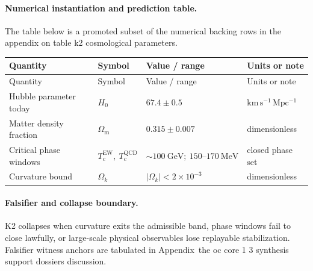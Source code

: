 \paragraph{Numerical instantiation and prediction table.}
The table below is a promoted subset of the numerical backing rows in the appendix on table k2 cosmological parameters.
\begin{longtable}{@{}L{0.27\textwidth}L{0.15\textwidth}L{0.24\textwidth}L{0.16\textwidth}@{}}
\toprule
Quantity & Symbol & Value / range & Units or note \\
\midrule
\endfirsthead
\toprule
Quantity & Symbol & Value / range & Units or note \\
\midrule
\endhead
Hubble parameter today & $\scriptstyle H_0$ & $67.4 \pm 0.5$ & $\mathrm{km\,s^{-1}\,Mpc^{-1}}$ \\
Matter density fraction & $\scriptstyle \Omega_{\mathrm{m}}$ & $0.315 \pm 0.007$ & dimensionless \\
Critical phase windows & $\scriptstyle T_c^{\mathrm{EW}},\allowbreak \ T_c^{\mathrm{QCD}}$ & $\sim 100\ \mathrm{GeV};\allowbreak \ 150\text{--}170\ \mathrm{MeV}$ & closed phase set \\
Curvature bound & $\scriptstyle \Omega_k$ & $|\Omega_k| < 2 \times 10^{-3}$ & dimensionless \\
\bottomrule
\end{longtable}

\paragraph{Falsifier and collapse boundary.}
K2 collapses when curvature exits the admissible band, phase windows fail to close lawfully, or large-scale physical observables lose replayable stabilization.
Falsifier witness anchors are tabulated in Appendix~the oc core 1 3 synthesis support dossiers discussion.

